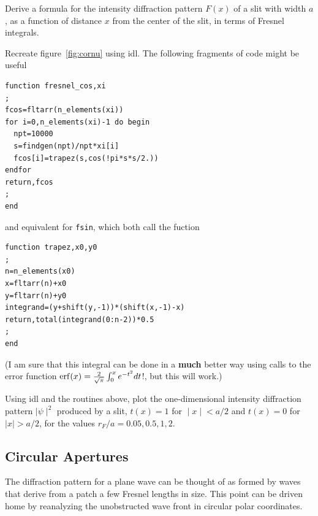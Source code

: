 \documentclass{article}
\def\labs{\mid\!}
\def\rabs{\!\mid}
\newenvironment{mylisting}
{\begin{list}{}{\setlength{\leftmargin}{1em}}\item\scriptsize\bfseries}
{\end{list}}
\begin{document}
\begin{enumerate}
\setcounter{enumi}{\value{count}}
\item Derive a formula for the intensity diffraction pattern $F(x)$ of a slit with width $a$, as a
function of distance $x$ from the center of the slit, in terms of Fresnel integrals. 
\item Recreate figure~\ref{fig:cornu} using {\sc idl}. The following fragments of code might 
be useful
\begin{mylisting}
\begin{verbatim}
function fresnel_cos,xi
;
fcos=fltarr(n_elements(xi))
for i=0,n_elements(xi)-1 do begin
  npt=10000
  s=findgen(npt)/npt*xi[i]
  fcos[i]=trapez(s,cos(!pi*s*s/2.))
endfor
return,fcos
;
end
\end{verbatim}
\end{mylisting}
and equivalent for {\tt fsin}, which both call the fuction
\begin{mylisting}
\begin{verbatim}
function trapez,x0,y0
;
n=n_elements(x0)
x=fltarr(n)+x0
y=fltarr(n)+y0
integrand=(y+shift(y,-1))*(shift(x,-1)-x)
return,total(integrand(0:n-2))*0.5
;
end
\end{verbatim}
\end{mylisting}
(I am sure that this integral can be done in a {\bf much} better way
using calls to the error function ${\rm
  erf}(x)={2\over\sqrt{\pi}}\int_0^xe^{-t^2}dt$!, but this will work.)
\item Using {\sc idl}  and the routines above, plot the one-dimensional intensity diffraction pattern
  $\labs\psi\rabs^2$ produced by a slit, $t(x)=1$ for $\rabs x\labs<
  {a/2}$ and $t(x)=0$ for $\labs x\rabs > {a/2}$, for the values
  ${r_F/a}=0.05, 0.5, 1, 2$.
\setcounter{count}{\value{enumi}}
\end{enumerate}

\subsection{Circular Apertures}

The diffraction pattern for a plane wave can be thought of as formed by waves 
that derive from a patch a few Fresnel lengths in size. This point can be 
driven home by reanalyzing the unobstructed wave front in circular polar
coordinates.
\end{document}
